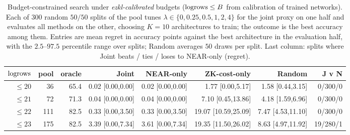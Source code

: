 \begin{table}[h]
\centering
\caption{Budget-constrained search under \emph{ezkl-calibrated} budgets ($\mathrm{logrows}\le B$ from calibration of trained
  networks).  Each of 300 random $50/50$ splits of the pool tunes $\lambda\in\{0,0.25,0.5,1,2,4\}$ for the joint
  proxy on one half and evaluates all methods on the other, choosing $K{=}10$ architectures to train; the outcome is the
  best accuracy among them.  Entries are mean regret in accuracy points against the best architecture in the
  evaluation half, with the $2.5$--$97.5$ percentile range over splits; Random averages $50$ draws per split.  Last
  column: splits where Joint beats / ties / loses to NEAR-only (regret).}
\label{tab:search}
\small
\begin{tabular}{rrrrrrrr}
\toprule
\textbf{$\mathrm{logrows}$} & \textbf{pool} & \textbf{oracle} & \textbf{Joint} & \textbf{NEAR-only} & \textbf{ZK-cost-only} & \textbf{Random} & \textbf{J v N} \\
\midrule
$\le20$ & 36 & 65.4 & 0.02 {\scriptsize[0.00,0.00]} & 0.02 {\scriptsize[0.00,0.00]} & 1.77 {\scriptsize[0.00,5.17]} & 1.58 {\scriptsize[0.44,3.15]} & 0/300/0 \\
$\le21$ & 72 & 71.3 & 0.04 {\scriptsize[0.00,0.00]} & 0.04 {\scriptsize[0.00,0.00]} & 7.10 {\scriptsize[0.45,13.86]} & 4.18 {\scriptsize[1.59,6.96]} & 0/300/0 \\
$\le22$ & 111 & 82.5 & 0.33 {\scriptsize[0.00,3.50]} & 0.33 {\scriptsize[0.00,3.50]} & 19.07 {\scriptsize[10.59,25.09]} & 7.47 {\scriptsize[4.53,11.10]} & 0/300/0 \\
$\le23$ & 175 & 82.5 & 3.39 {\scriptsize[0.00,7.34]} & 3.61 {\scriptsize[0.00,7.34]} & 19.35 {\scriptsize[11.50,26.02]} & 8.63 {\scriptsize[4.97,11.92]} & 19/280/1 \\
\bottomrule
\end{tabular}
\end{table}
